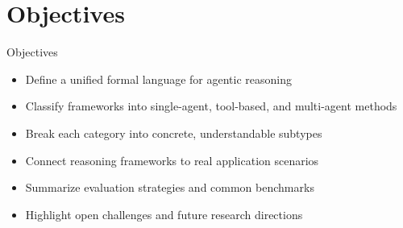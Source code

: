 \documentclass[10pt]{beamer}
\begin{document}
\section{Objectives}
\begin{frame}{Objectives}
\begin{itemize}
  \item Define a unified formal language for agentic reasoning
  \item Classify frameworks into single-agent, tool-based, and multi-agent methods
  \item Break each category into concrete, understandable subtypes
  \item Connect reasoning frameworks to real application scenarios
  \item Summarize evaluation strategies and common benchmarks
  \item Highlight open challenges and future research directions
\end{itemize}
\end{frame}
\end{document}
